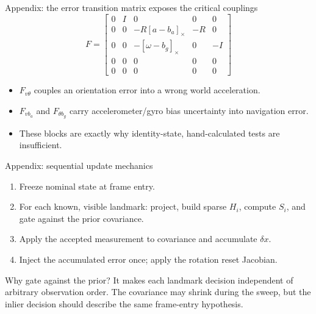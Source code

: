 \documentclass[10pt,aspectratio=169]{beamer}
\begin{document}
\begin{frame}{Appendix: the error transition matrix exposes the critical couplings}
  \scriptsize
  \[
  F = \begin{bmatrix}
  0&I&0&0&0\\
  0&0&-R[a-b_a]_\times&-R&0\\
  0&0&-[\omega-b_g]_\times&0&-I\\
  0&0&0&0&0\\
  0&0&0&0&0
  \end{bmatrix}
  \]
  \normalsize
  \begin{itemize}
    \item $F_{v\theta}$ couples an orientation error into a wrong world acceleration.
    \item $F_{vb_a}$ and $F_{\theta b_g}$ carry accelerometer/gyro bias uncertainty into navigation error.
    \item These blocks are exactly why identity-state, hand-calculated tests are insufficient.
  \end{itemize}
\end{frame}

\begin{frame}{Appendix: sequential update mechanics}
  \begin{enumerate}
    \item Freeze nominal state at frame entry.
    \item For each known, visible landmark: project, build sparse $H_i$, compute $S_i$, and gate against the prior covariance.
    \item Apply the accepted measurement to covariance and accumulate $\delta x$.
    \item Inject the accumulated error once; apply the rotation reset Jacobian.
  \end{enumerate}
  \vspace{0.7em}
  \begin{block}{Why gate against the prior?}
    It makes each landmark decision independent of arbitrary observation order. The covariance may shrink during the sweep, but the inlier decision should describe the same frame-entry hypothesis.
  \end{block}
\end{frame}
\end{document}
